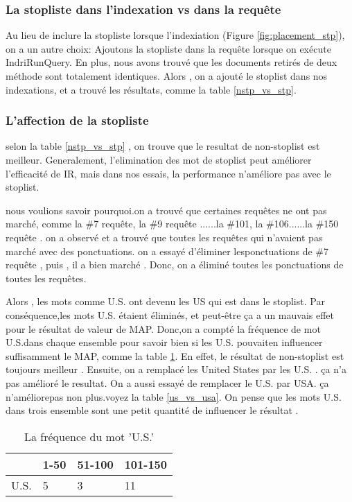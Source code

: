 \documentclass[a4paper]{article}
\begin{document}
\subsubsection{La stopliste dans l'indexation vs dans la requête}

Au lieu de inclure la stopliste lorsque l'indexiation (Figure \ref{fig:placement_stp}),
on a un autre choix: Ajoutons la stopliste dans la requête lorsque on exécute IndriRunQuery. En plus, nous avons trouvé que les documents retirés de deux méthode sont totalement identiques.
Alors , on a ajouté le stoplist dans nos indexations, et a trouvé les résultats, comme la table  \ref{nstp_vs_stp}. 

\subsubsection{L'affection de la stopliste}

  selon la table  \ref{nstp_vs_stp} , on trouve que le resultat de non-stoplist est meilleur. 
Generalement, l'elimination des mot de stoplist peut améliorer l'efficacité de IR, mais dans nos essais, la performance n'améliore pas avec le stoplist. 


nous voulions savoir pourquoi.on a trouvé que certaines requêtes ne ont pas marché, comme la \#7 requête, la \#9 requête ......la \#101, la \#106......la \#150 requête . on a observé et a trouvé que toutes les requêtes qui n'avaient pas marché avec des ponctuations. on a essayé d'éliminer lesponctuations de \#7 requête , puis , il a bien marché . Donc, on a éliminé toutes les ponctuations de toutes les requêtes. 


 Alors  , les mots comme U.S. ont devenu les US qui est dans le stoplist.
 Par conséquence,les mots U.S. étaient éliminés, et peut-être  ça a un mauvais effet pour le résultat de valeur de MAP.
 Donc,on a compté la fréquence de mot U.S.dans chaque ensemble  pour savoir bien si les U.S. pouvaiten influencer suffisamment le MAP, comme la table \ref{tab:word_us}. En effet, le résultat de non-stoplist est toujours meilleur . Ensuite, on a remplacé les United States par les U.S. . ça n'a pas  amélioré le resultat. 
 On a aussi essayé de remplacer le U.S. par USA. ça n'améliorepas non plus.voyez la table \ref{us_vs_usa}.  
 On pense que les mots U.S. dans trois ensemble sont une petit quantité de influencer le résultat .

 
 


\begin{table}[htp]
\centering
\begin{tabular}{|l|l|l|l|}
\hline
   & 1-50 & 51-100 & 101-150 \\ \hline
U.S. & 5    & 3      & 11      \\ \hline
\end{tabular}
\caption{La fréquence du mot 'U.S.'}
\label{tab:word_us}
\end{table}
\end{document}
